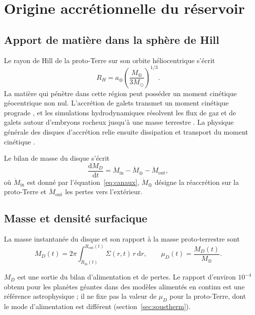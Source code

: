 \documentclass[11pt,a4paper,openany]{report}
\newcommand{\Mt}{M_{\oplus}}
\newcommand{\dd}{\mathrm{d}}
\begin{document}
\section{Origine accrétionnelle du réservoir}
\subsection{Apport de matière dans la sphère de Hill}

Le rayon de Hill de la proto-Terre sur son orbite héliocentrique s'écrit
\begin{equation}
R_H=a_\oplus\left(\frac{\Mt}{3M_\odot}\right)^{1/3}.
\label{eq:RH}
\end{equation}
La matière qui pénètre dans cette région peut posséder un moment cinétique géocentrique non
nul. L'accrétion de galets transmet un moment cinétique prograde \cite{JohansenLacerda2010,Visser2020},
et les simulations hydrodynamiques résolvent les flux de gaz et de galets autour d'embryons
rocheux jusqu'à une masse terrestre \cite{Popovas2018}. La physique générale des disques
d'accrétion relie ensuite dissipation et transport du moment cinétique \cite{Pringle1981}.

Le bilan de masse du disque s'écrit
\begin{equation}
\frac{\dd M_D}{\dd t}=\dot M_{\mathrm{in}}-\dot M_{\oplus}-\dot M_{\mathrm{out}},
\label{eq:bilanM}
\end{equation}
où $\dot M_{\mathrm{in}}$ est donné par l'équation~\eqref{eq:canaux}, $\dot M_{\oplus}$ désigne la
réaccrétion sur la proto-Terre et $\dot M_{\mathrm{out}}$ les pertes vers l'extérieur.

\subsection{Masse et densité surfacique}

La masse instantanée du disque et son rapport à la masse proto-terrestre sont
\begin{equation}
M_D(t)=2\pi\int_{R_{\mathrm{in}}(t)}^{R_{\mathrm{out}}(t)}\Sigma(r,t)\,r\,\dd r,
\qquad
\mu_D(t)=\frac{M_D(t)}{\Mt}.
\label{eq:MD}
\end{equation}

\begin{lecture}
$M_D$ est une sortie du bilan d'alimentation et de pertes. Le rapport d'environ $10^{-4}$ obtenu
pour les planètes géantes dans des modèles alimentés en continu \cite{CanupWard2006} est une
référence astrophysique ; il ne fixe pas la valeur de $\mu_D$ pour la proto-Terre, dont le mode
d'alimentation est différent (section~\ref{sec:soustherm}).
\end{lecture}
\end{document}
